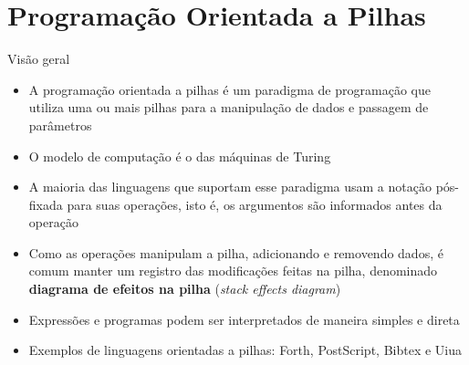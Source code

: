 \section{Programação Orientada a Pilhas}

\begin{frame}[fragile]{Visão geral}

    \begin{itemize}
        \item A programação orientada a pilhas é um paradigma de programação que utiliza uma ou
            mais pilhas para a manipulação de dados e passagem de parâmetros

        \item O modelo de computação é o das máquinas de Turing

        \item A maioria das linguagens que suportam esse paradigma usam a notação pós-fixada para
            suas operações, isto é, os argumentos são informados antes da operação

        \item Como as operações manipulam a pilha, adicionando e removendo dados, é comum manter
            um registro das modificações feitas na pilha, denominado \textbf{diagrama de efeitos na
            pilha} (\textit{stack effects diagram})

        \item Expressões e programas podem ser interpretados de maneira simples e direta

        \item Exemplos de linguagens orientadas a pilhas: Forth, PostScript, Bibtex e Uiua

    \end{itemize}

\end{frame}
